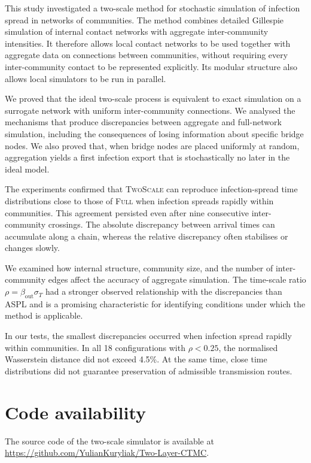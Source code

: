 \documentclass[a4paper,fleqn]{cas-sc}
\newcommand{\Full}{\textup{\textsc{Full}}}
\newcommand{\TS}{\textup{\textsc{TwoScale}}}
\begin{document}
This study investigated a two-scale method for stochastic simulation of infection spread in networks of communities. The method combines detailed Gillespie simulation of internal contact networks with aggregate inter-community intensities. It therefore allows local contact networks to be used together with aggregate data on connections between communities, without requiring every inter-community contact to be represented explicitly. Its modular structure also allows local simulators to be run in parallel.

We proved that the ideal two-scale process is equivalent to exact simulation on a surrogate network with uniform inter-community connections. We analysed the mechanisms that produce discrepancies between aggregate and full-network simulation, including the consequences of losing information about specific bridge nodes. We also proved that, when bridge nodes are placed uniformly at random, aggregation yields a first infection export that is stochastically no later in the ideal model.

The experiments confirmed that \TS{} can reproduce infection-spread time distributions close to those of \Full{} when infection spreads rapidly within communities. This agreement persisted even after nine consecutive inter-community crossings. The absolute discrepancy between arrival times can accumulate along a chain, whereas the relative discrepancy often stabilises or changes slowly.

We examined how internal structure, community size, and the number of inter-community edges affect the accuracy of aggregate simulation. The time-scale ratio $\rho=\beta_{\mathrm{out}}\sigma_T$ had a stronger observed relationship with the discrepancies than ASPL and is a promising characteristic for identifying conditions under which the method is applicable.

In our tests, the smallest discrepancies occurred when infection spread rapidly within communities. In all 18 configurations with $\rho<0.25$, the normalised Wasserstein distance did not exceed 4.5\%. At the same time, close time distributions did not guarantee preservation of admissible transmission routes.

\section*{Code availability}
The source code of the two-scale simulator is available at
\url{https://github.com/YulianKuryliak/Two-Layer-CTMC}.

\clearpage



\end{document}
